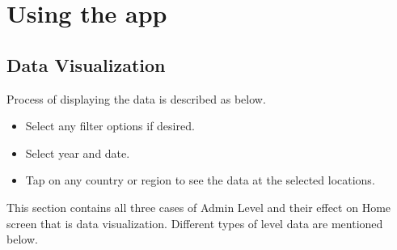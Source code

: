 \section{Using the app}

\subsection{Data Visualization}

Process of displaying the data is described as below.

\begin{itemize}
    \item Select any filter options if desired.
    \item Select year and date.
    \item Tap on any country or region to see the data at the selected locations.
\end{itemize}
This section contains all three cases of Admin Level and their effect on Home screen that is data visualization. Different types of level data are mentioned below.

